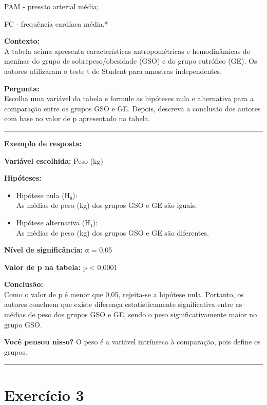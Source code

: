 \documentclass[
]{book}
\begin{document}
PAM - pressão arterial média;

FC - frequência cardíaca média.*

\textbf{Contexto:}\\
A tabela acima apresenta características antropométricas e hemodinâmicas de meninas do grupo de sobrepeso/obesidade (GSO) e do grupo eutrófico (GE). Os autores utilizaram o teste t de Student para amostras independentes.

\textbf{Pergunta:}\\
Escolha uma variável da tabela e formule as hipóteses nula e alternativa para a comparação entre os grupos GSO e GE. Depois, descreva a conclusão dos autores com base no valor de p apresentado na tabela.

\begin{center}\rule{0.5\linewidth}{0.5pt}\end{center}

\textbf{Exemplo de resposta:}

\textbf{Variável escolhida:} Peso (kg)

\textbf{Hipóteses:}

\begin{itemize}
\item
  Hipótese nula (H₀):\\
  As médias de peso (kg) dos grupos GSO e GE são iguais.
\item
  Hipótese alternativa (H₁):\\
  As médias de peso (kg) dos grupos GSO e GE são diferentes.
\end{itemize}

\textbf{Nível de significância:} α = 0,05

\textbf{Valor de p na tabela:} p \textless{} 0,0001

\textbf{Conclusão:}\\
Como o valor de p é menor que 0,05, rejeita-se a hipótese nula. Portanto, os autores concluem que existe diferença estatisticamente significativa entre as médias de peso dos grupos GSO e GE, sendo o peso significativamente maior no grupo GSO.

\textbf{Você pensou nisso?}
O peso é a variável intrínseca à comparação, pois define os grupos.

\begin{center}\rule{0.5\linewidth}{0.5pt}\end{center}

\section{Exercício 3}\label{exercuxedcio-3}
\end{document}
